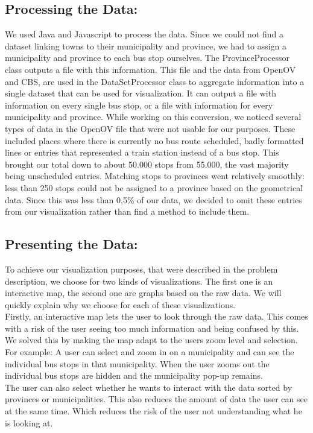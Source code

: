 \documentclass[a4paper,11pt]{article}
\begin{document}
\subsection{Processing the Data:}
We used Java and Javascript to process the data. Since we could not find a dataset linking towns to their municipality and province, we had to assign a municipality and province to each bus stop ourselves. The ProvinceProcessor class outputs a file with this information.
This file and the data from OpenOV and CBS, are used in the DataSetProcessor class to aggregate information into a single dataset that can be used for visualization. It can output a file with information on every single bus stop, or a file with information for every municipality and province.
While working on this conversion, we noticed several types of data in the OpenOV file that were not usable for our purposes. These included places where there is currently no bus route scheduled, badly formatted lines or entries that represented a train station instead of a bus stop. This brought our total down to about 50.000 stops from 55.000, the vast majority being unscheduled entries. Matching stops to provinces went relatively smoothly: less than 250 stops could not be assigned to a province based on the geometrical data. Since this was less than 0,5\% of our data, we decided to omit these entries from our visualization rather than find a method to include them.
\subsection{Presenting the Data:}
To achieve our visualization purposes, that were described in the problem description, we choose for two kinds of visualizations. The first one is an interactive map, the second one are graphs based on the raw data. We will quickly explain why we choose for each of these visualizations.\\

Firstly, an interactive map lets the user to look through the raw data. This comes with a risk of the user seeing too much information and being confused by this. We solved this by making the map adapt to the users zoom level and selection. For example: A user can select and zoom in on a municipality and can see the individual bus stops in that municipality. When the user zooms out the individual bus stops are hidden and the municipality pop-up remains.\\
The user can also select whether he wants to interact with the data sorted by provinces or municipalities. This also reduces the amount of data the user can see at the same time. Which reduces the risk of the user not understanding what he is looking at.\\
\end{document}
